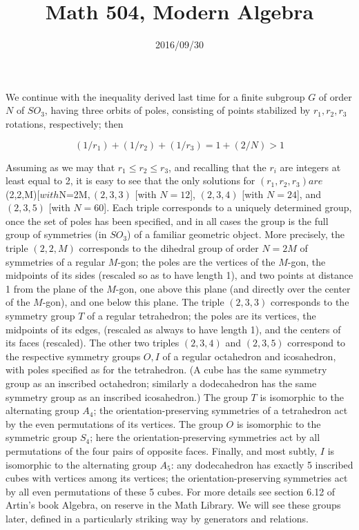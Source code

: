 \documentclass[10pt]{article}
\title{Math 504, Modern Algebra}
\date{2016/09/30}
\begin{document}
\maketitle

We continue with the inequality derived last time for a finite subgroup
$G$ of order $N$ of $SO_3$, having three orbits of poles, consisting of
points stabilized by $r_1,r_2,r_3$ rotations, respectively; then

\[
(1/r_1) + (1/r_2) + (1/r_3) = 1 + (2/N) > 1
\]

Assuming as we may that $r_1\le r_2\le r_3$, and recalling that the
$r_i$ are integers at least equal to 2, it is easy to see that the only
solutions for $(r_1,r_2,r_3) are $(2,2,M)$ [with $N=2M$, (2,3,3)$ [with
    $N = 12$], $(2,3,4)$ [with $N = 24$], and $(2,3,5)$ [with $N = 60$].
  Each triple corresponds to a uniquely determined group, once the set
  of poles has been specified, and in all cases the group is the full
  group of symmetries (in $SO_3$) of a familiar geometric object. More
  precisely, the triple $(2,2,M)$ corresponds to the dihedral group of
  order $N = 2M$ of symmetries of a regular $M$-gon; the poles are the
  vertices of the $M$-gon, the midpoints of its sides (rescaled so as to
  have length 1), and two points at distance 1 from the plane of the
  $M$-gon, one above this plane (and directly over the center of the
  $M$-gon), and one below this plane. The triple $(2,3,3)$ corresponds
  to the symmetry group $T$ of a regular tetrahedron; the poles are its
  vertices, the midpoints of its edges, (rescaled as always to have
  length 1), and the centers of its faces (rescaled). The other two
  triples $(2,3,4)$ and $(2,3,5)$ correspond to the respective symmetry
  groups $O,I$ of a regular octahedron and icosahedron, with poles
  specified as for the tetrahedron. (A cube has the same symmetry group
  as an inscribed octahedron; similarly a dodecahedron has the same
  symmetry group as an inscribed icosahedron.) The group $T$ is
  isomorphic to the alternating group $A_4$; the orientation-preserving
  symmetries of a tetrahedron act by the even permutations of its
  vertices. The group $O$ is isomorphic to the symmetric group $S_4$;
  here the orientation-preserving symmetries act by all permutations of
  the four pairs of opposite faces. Finally, and most subtly, $I$ is
  isomorphic to the alternating group $A_5$: any dodecahedron has
  exactly 5 inscribed cubes with vertices among its vertices; the
  orientation-preserving symmetries act by all even permutations of
  these 5 cubes. For more details see section 6.12 of Artin's book
  Algebra, on reserve in the Math Library. We will see these groups
  later, defined in a particularly striking way by generators and
  relations.
\end{document}
